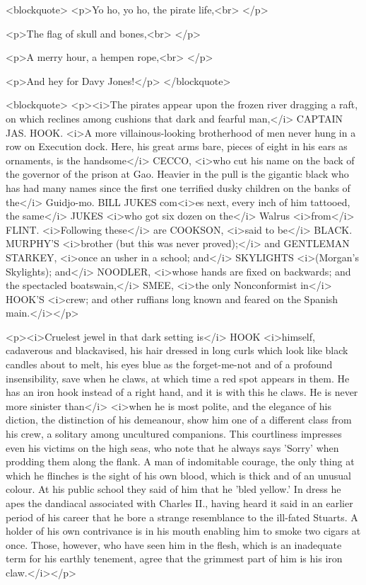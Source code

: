 <blockquote>
<p>Yo ho, yo ho, the pirate life,<br>
</p>

<p>The flag of skull and bones,<br>
</p>

<p>A merry hour, a hempen rope,<br>
</p>

<p>And hey for Davy Jones!</p>
</blockquote>

<blockquote>
<p><i>The pirates appear upon the frozen river dragging a raft, on
which reclines among cushions that dark and fearful man,</i> CAPTAIN
JAS. HOOK. <i>A more villainous-looking brotherhood of men never hung
in a row on Execution dock. Here, his great arms bare, pieces of
eight in his ears as ornaments, is the handsome</i> CECCO, <i>who cut
his name on the back of the governor of the prison at Gao. Heavier in
the pull is the gigantic black who has had many names since the first
one terrified dusky children on the banks of the</i> Guidjo-mo. BILL
JUKES com<i>es next, every inch of him tattooed, the same</i> JUKES
<i>who got six dozen on the</i> Walrus <i>from</i> FLINT.
<i>Following these</i> are COOKSON, <i>said to be</i> BLACK. MURPHY'S
<i>brother (but this was never proved);</i> and GENTLEMAN STARKEY,
<i>once an usher in a school; and</i> SKYLIGHTS <i>(Morgan's
Skylights); and</i> NOODLER, <i>whose hands are fixed on backwards;
and the spectacled boatswain,</i> SMEE, <i>the only Nonconformist
in</i> HOOK'S <i>crew; and other ruffians long known and feared on
the Spanish main.</i></p>

<p><i>Cruelest jewel in that dark setting is</i> HOOK <i>himself,
cadaverous and blackavised, his hair dressed in long curls which look
like black candles about to melt, his eyes blue as the forget-me-not
and of a profound insensibility, save when he claws, at which time a
red spot appears in them. He has an iron hook instead of a right
hand, and it is with this he claws. He is never more sinister
than</i> <i>when he is most polite, and the elegance of his diction,
the distinction of his demeanour, show him one of a different class
from his crew, a solitary among uncultured companions. This
courtliness impresses even his victims on the high seas, who note
that he always says 'Sorry' when prodding them along the flank. A man
of indomitable courage, the only thing at which he flinches is the
sight of his own blood, which is thick and of an unusual colour. At
his public school they said of him that he 'bled yellow.' In dress he
apes the dandiacal associated with Charles II., having heard it said
in an earlier period of his career that he bore a strange resemblance
to the ill-fated Stuarts. A holder of his own contrivance is in his
mouth enabling him to smoke two cigars at once. Those, however, who
have seen him in the flesh, which is an inadequate term for his
earthly tenement, agree that the grimmest part of him is his iron
claw.</i></p>

